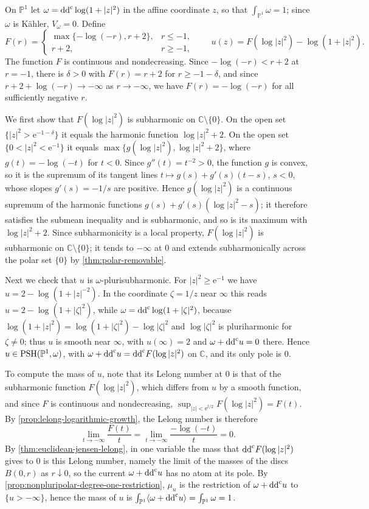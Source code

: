 \begin{example}\label{ex:loglog-full-mass-envelope}
On $\mathbb P^1$ let $\omega=\mathrm{dd}^{\mathrm{c}}\log(1+|z|^2)$ in the affine coordinate $z$, so that $\int_{\mathbb P^1}\omega=1$; since $\omega$ is K\"ahler, $V_\omega=0$. Define
\[
 F(r)=\begin{cases}
       \max\{-\log(-r),r+2\},&r\leq-1,\\
       r+2,&r\geq-1,
      \end{cases}
 \qquad
 u(z)=F(\log|z|^2)-\log(1+|z|^2).
\]
The function $F$ is continuous and nondecreasing. Since $-\log(-r)<r+2$ at $r=-1$, there is $\delta>0$ with $F(r)=r+2$ for $r\geq-1-\delta$, and since $r+2+\log(-r)\to-\infty$ as $r\to-\infty$, we have $F(r)=-\log(-r)$ for all sufficiently negative $r$.

We first show that $F(\log|z|^2)$ is subharmonic on $\mathbb C\setminus\{0\}$. On the open set $\{|z|^2>\mathrm e^{-1-\delta}\}$ it equals the harmonic function $\log|z|^2+2$. On the open set $\{0<|z|^2<\mathrm e^{-1}\}$ it equals $\max\{g(\log|z|^2),\log|z|^2+2\}$, where $g(t)=-\log(-t)$ for $t<0$. Since $g''(t)=t^{-2}>0$, the function $g$ is convex, so it is the supremum of its tangent lines $t\mapsto g(s)+g'(s)(t-s)$, $s<0$, whose slopes $g'(s)=-1/s$ are positive. Hence $g(\log|z|^2)$ is a continuous supremum of the harmonic functions $g(s)+g'(s)(\log|z|^2-s)$; it therefore satisfies the submean inequality and is subharmonic, and so is its maximum with $\log|z|^2+2$. Since subharmonicity is a local property, $F(\log|z|^2)$ is subharmonic on $\mathbb C\setminus\{0\}$; it tends to $-\infty$ at $0$ and extends subharmonically across the polar set $\{0\}$ by \cref{thm:polar-removable}.

Next we check that $u$ is $\omega$-plurisubharmonic. For $|z|^2\geq\mathrm e^{-1}$ we have $u=2-\log(1+|z|^{-2})$. In the coordinate $\zeta=1/z$ near $\infty$ this reads $u=2-\log(1+|\zeta|^2)$, while $\omega=\mathrm{dd}^{\mathrm{c}}\log(1+|\zeta|^2)$, because $\log(1+|z|^2)=\log(1+|\zeta|^2)-\log|\zeta|^2$ and $\log|\zeta|^2$ is pluriharmonic for $\zeta\ne0$; thus $u$ is smooth near $\infty$, with $u(\infty)=2$ and $\omega+\mathrm{dd}^{\mathrm{c}} u=0$ there. Hence $u\in\mathrm{PSH}(\mathbb P^1,\omega)$, with $\omega+\mathrm{dd}^{\mathrm{c}} u=\mathrm{dd}^{\mathrm{c}} F(\log|z|^2)$ on $\mathbb C$, and its only pole is $0$.

To compute the mass of $u$, note that its Lelong number at $0$ is that of the subharmonic function $F(\log|z|^2)$, which differs from $u$ by a smooth function, and since $F$ is continuous and nondecreasing, $\sup_{|z|<\mathrm e^{t/2}}F(\log|z|^2)=F(t)$. By \cref{prop:lelong-logarithmic-growth}, the Lelong number is therefore
\[
 \lim_{t\to-\infty}\frac{F(t)}t=\lim_{t\to-\infty}\frac{-\log(-t)}t=0.
\]
By \cref{thm:euclidean-jensen-lelong}, in one variable the mass that $\mathrm{dd}^{\mathrm{c}} F(\log|z|^2)$ gives to $0$ is this Lelong number, namely the limit of the masses of the discs $B(0,r)$ as $r\downarrow0$, so the current $\omega+\mathrm{dd}^{\mathrm{c}} u$ has no atom at its pole. By \cref{prop:nonpluripolar-degree-one-restriction}, $\mu_u$ is the restriction of $\omega+\mathrm{dd}^{\mathrm{c}} u$ to $\{u>-\infty\}$, hence the mass of $u$ is $\int_{\mathbb P^1}\langle\omega+\mathrm{dd}^{\mathrm{c}} u\rangle=\int_{\mathbb P^1}\omega=1$.


\end{example}
